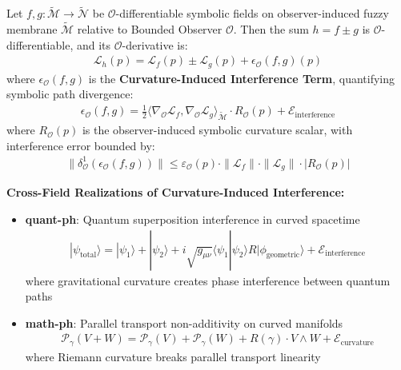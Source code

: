 \begin{theorem}
\label{theorem:bk4_fuzzy_sum_rule}
Let $f, g: \tilde{\mathcal{M}} \rightarrow \tilde{\mathcal{N}}$ be $\mathcal{O}$-differentiable symbolic fields on observer-induced fuzzy membrane $\tilde{\mathcal{M}}$ relative to Bounded Observer $\mathcal{O}$. Then the sum $h = f \pm g$ is $\mathcal{O}$-differentiable, and its $\mathcal{O}$-derivative is:
\begin{align}
\mathcal{L}_h(p) = \mathcal{L}_f(p) \pm \mathcal{L}_g(p) + \epsilon_{\mathcal{O}}(f, g)(p)
\end{align}
where $\epsilon_{\mathcal{O}}(f, g)$ is the \textbf{Curvature-Induced Interference Term}, quantifying symbolic path divergence:
\begin{align}
\epsilon_{\mathcal{O}}(f, g) = \frac{1}{2}\langle \nabla_{\mathcal{O}} \mathcal{L}_f, \nabla_{\mathcal{O}} \mathcal{L}_g \rangle_{\tilde{\mathcal{M}}} \cdot R_{\mathcal{O}}(p) + \mathcal{E}_{\text{interference}}
\end{align}
where $R_{\mathcal{O}}(p)$ is the observer-induced symbolic curvature scalar, with interference error bounded by:
\begin{align}
\|\delta^1_{\mathcal{O}}(\epsilon_{\mathcal{O}}(f, g))\| \leq \varepsilon_{\mathcal{O}}(p) \cdot \|\mathcal{L}_f\| \cdot \|\mathcal{L}_g\| \cdot |R_{\mathcal{O}}(p)|
\end{align}

\textbf{Cross-Field Realizations of Curvature-Induced Interference:}

\begin{itemize}
\item \textbf{quant-ph}: Quantum superposition interference in curved spacetime
  \begin{align}
  |\psi_{\text{total}}\rangle = |\psi_1\rangle + |\psi_2\rangle + i\sqrt{g_{\mu\nu}} \langle \psi_1 | \psi_2 \rangle R |\phi_{\text{geometric}}\rangle + \mathcal{E}_{\text{interference}}
  \end{align}
  where gravitational curvature creates phase interference between quantum paths
  
\item \textbf{math-ph}: Parallel transport non-additivity on curved manifolds
  \begin{align}
  \mathcal{P}_{\gamma}(V + W) = \mathcal{P}_{\gamma}(V) + \mathcal{P}_{\gamma}(W) + R(\gamma) \cdot V \wedge W + \mathcal{E}_{\text{curvature}}
  \end{align}
  where Riemann curvature breaks parallel transport linearity
  

\end{itemize}
\end{theorem}
